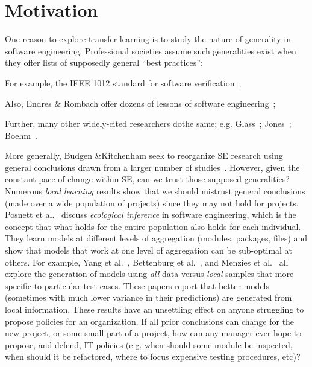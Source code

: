 \section{Motivation}
\label{sec:Motivation}

One reason to explore transfer learning
is to study the nature of
generality in software engineering.  Professional
societies assume such generalities exist when they
offer lists of supposedly general ``best practices'':
\bi
\item For example, the  IEEE 1012 standard for software
  verification~\cite{1012};
\item
  Also, Endres & Rombach offer
dozens of lessons of software
engineering~\cite{endres03};
\item Further, many other
widely-cited researchers dothe same; e.g.
Glass~\cite{glass02}; Jones~\cite{jones10};
Boehm~\cite{hoehm00b}.
\item
  More generally, Budgen &Kitchenham seek to
reorganize SE research using general conclusions
drawn from a larger number of
studies~\cite{budgen06,budgen09}.
\ei
However,
given the constant pace of change within SE, can we trust
those supposed generalities? 
Numerous {\em local learning} results show that we
should mistrust general conclusions (made over a
wide population of projects) since they may not hold
for projects.  Posnett et al.~\cite{posnett11}
discuss {\em ecological inference} in software
engineering, which is the concept that what holds
for the entire population also holds for each
individual.  They learn models at different levels
of aggregation (modules, packages, files) and show
that models that work at one level of aggregation
can be sub-optimal at others.  For example, Yang et
al.~\cite{yang11}, Bettenburg et
al.~\cite{betten14}, and Menzies et al.~\cite{me12d}
all explore the generation of models using {\em all}
data versus {\em local} samples that more specific
to particular test cases. These papers report that
better models (sometimes with much lower variance in
their predictions) are generated from local
information.
These results have an unsettling effect on anyone
struggling to propose policies for an organization.
If all prior conclusions can change for the new
project, or some small part of a project, how can
any manager ever hope to propose, and defend, IT
policies (e.g. when should some module be inspected,
when should it be refactored, where to focus
expensive testing procedures, etc)?

